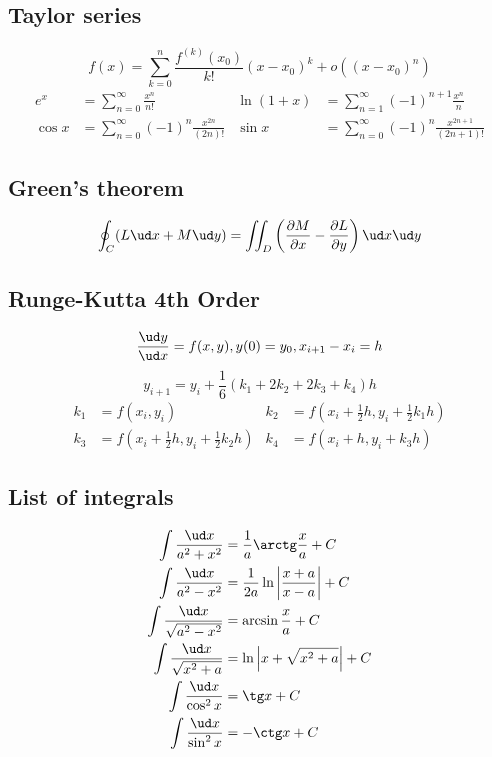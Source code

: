 \subsection*{Taylor series}
$$f(x) = \sum_{k=0}^n \frac{f^{(k)}(x_0)}{k!} (x-x_0)^k + o((x-x_0)^n)$$
\begin{align*}
e^x &= \sum_{n=0}^\infty \frac{x^n}{n!} &
\ln (1 + x) &= \sum_{n = 1}^\infty (-1)^{n + 1} \frac{x^n}{n} \\
\cos x &= \sum_{n=0}^\infty (-1)^n \frac{x^{2n}}{(2n)!} &
\sin x &= \sum_{n=0}^\infty (-1)^n \frac{x^{2n + 1}}{(2n + 1)!}
\end{align*}

\subsection*{Green's theorem}
$$\oint_C (L \ud x + M \ud y) = \iint_D \left(\frac{\partial M}{\partial x}-\frac{\partial L}{\partial y}\right) \ud x \ud y$$

\subsection*{Runge-Kutta 4th Order}
$$\frac{\ud y}{\ud x} = f(x, y), y(0) = y_0, x_{i + 1} - x_i = h$$
$$y_{i + 1} = y_i + \frac{1}{6}(k_1 + 2 k_2 + 2 k_3 + k_4) h$$
\begin{align*}
k_1 &= f(x_i, y_i) & k_2 &= f(x_i + \frac{1}{2} h, y_i + \frac{1}{2} k_1 h) \\
k_3 &= f(x_i + \frac{1}{2} h, y_i + \frac{1}{2} k_2 h) & k_4 &= f(x_i + h, y_i + k_3 h)
\end{align*}

\subsection*{List of integrals}
\begin{align*}
\int \frac{\ud x}{a^2 + x^2} &= \frac{1}{a} \arctg \frac{x}{a} + C \\
\int \frac{\ud x}{a^2 - x^2} &= \frac{1}{2a} \ln \left\lvert \frac{x + a}{x - a} \right\rvert + C \\
\int \frac{\ud x}{\sqrt{a^2 - x^2}} &= \arcsin \frac{x}{a} + C \\
\int \frac{\ud x}{\sqrt{x^2 + a}} &= \ln \left\lvert x + \sqrt{x^2 + a} \right\rvert + C \\
\int \frac{\ud x}{\cos^2 x} &= \tg x + C \\
\int \frac{\ud x}{\sin^2 x} &= -\ctg x + C
\end{align*}

